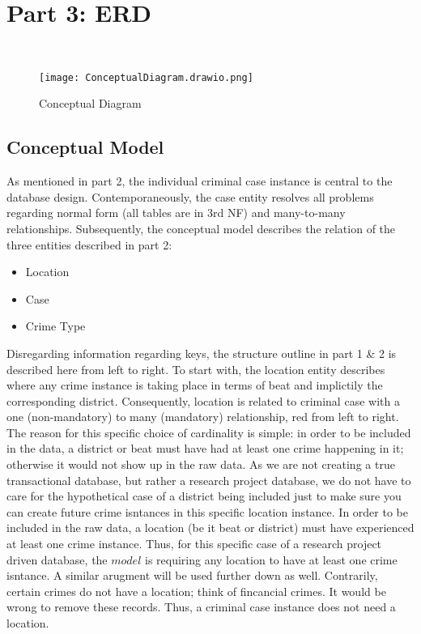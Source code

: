 \documentclass[a4paper]{article}
\begin{document}
\section{Part 3: ERD}

\

\begin{figure}[htp]
		\centering
		\texttt{[image: ConceptualDiagram.drawio.png]}
         \small
         \caption{Conceptual Diagram}
\end{figure}



\subsection{Conceptual Model}
As mentioned in part 2, the individual criminal case instance is central to the database design. Contemporaneously, the case entity resolves all problems regarding normal form (all tables are in 3rd NF) and many-to-many relationships. Subsequently, the conceptual model describes the relation of the three entities described in part 2: 

\begin{itemize}
  \item Location
  \item Case
  \item Crime Type
\end{itemize}

\indent Disregarding information regarding keys, the structure outline in part 1 \& 2 is described here from left to right. To start with, the location entity describes where any crime instance is taking place in terms of beat and implictily the corresponding district. Consequently, location is related to criminal case with a one (non-mandatory) to many (mandatory) relationship, red from left to right. 
The reason for this specific choice of cardinality is simple: in order to be included in the data, a district or beat must have had at least one crime happening in it; otherwise it would not show up in the raw data. As we are not creating a true transactional database, but rather a research project database, we do not have to care for the hypothetical case of a district being included just to make sure you can create future crime isntances in this specific location instance. In order to be included in the raw data, a location (be it beat or district) must have experienced at least one crime instance. Thus, for this specific case of a research project driven database, the $model$ is requiring any location to have at least one crime isntance. A similar arugment will be used further down as well. Contrarily, certain crimes do not have a location; think of fincancial crimes. It would be wrong to remove these records. Thus, a criminal case instance does not need a location.
\end{document}
